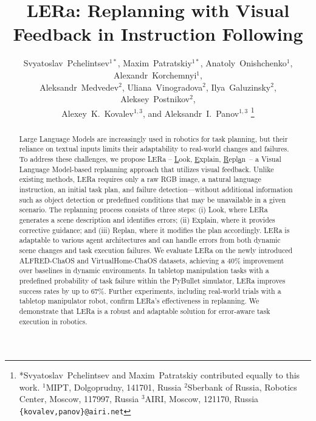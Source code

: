 \documentclass[letterpaper, 10 pt, conference]{ieeeconf}  %
\title{\LARGE \bf
LERa: Replanning with Visual Feedback in Instruction Following
}
\author{Svyatoslav~Pchelintsev$^{1*}$, Maxim~Patratskiy$^{1*}$, Anatoly~Onishchenko$^{1}$, Alexandr~Korchemnyi$^{1}$, \\Aleksandr~Medvedev$^{2}$, Uliana~Vinogradova$^{2}$, Ilya~Galuzinsky$^{2}$, Aleksey~Postnikov$^{2}$, \\Alexey~K.~Kovalev$^{1,3}$, and Aleksandr~I.~Panov$^{1,3}$
\thanks{*Svyatoslav~Pchelintsev and Maxim~Patratskiy contributed equally to this work. $^{1}$MIPT, Dolgoprudny, 141701, Russia $^{2}$Sberbank of Russia, Robotics Center, Moscow, 117997, Russia $^{3}$AIRI, Moscow, 121170, Russia {\tt\small \{kovalev,panov\}@airi.net}}%
}
\begin{document}
\maketitle
\thispagestyle{empty}
\pagestyle{empty}


\begin{abstract}
Large Language Models are increasingly used in robotics for task planning, but their reliance on textual inputs limits their adaptability to real-world changes and failures. To address these challenges, we propose LERa -- \underline{L}ook, \underline{E}xplain, \underline{R}epl\underline{a}n~-- a Visual Language Model-based replanning approach that utilizes visual feedback. Unlike existing methods, LERa requires only a raw RGB image, a natural language instruction, an initial task plan, and failure detection—without additional information such as object detection or predefined conditions that may be unavailable in a given scenario. The replanning process consists of three steps: (i) Look, where LERa generates a scene description and identifies errors; (ii) Explain, where it provides corrective guidance; and (iii) Replan, where it modifies the plan accordingly. LERa is adaptable to various agent architectures and can handle errors from both dynamic scene changes and task execution failures. We evaluate LERa on the newly introduced ALFRED-ChaOS and VirtualHome-ChaOS datasets, achieving a 40\% improvement over baselines in dynamic environments. In tabletop manipulation tasks with a predefined probability of task failure within the PyBullet simulator, LERa improves success rates by up to 67\%. Further experiments, including real-world trials with a tabletop manipulator robot, confirm LERa’s effectiveness in replanning. We demonstrate that LERa is a robust and adaptable solution for error-aware task execution in robotics.
\end{abstract}
\end{document}
